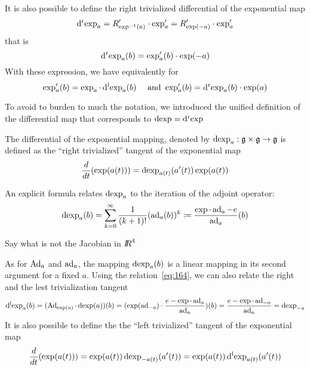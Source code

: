 It is also possible to define the right trivialized differential of the exponential map
\begin{equation}
  \label{eq:162}
  \operatorname{d^r exp}_a = R'_{\exp^{-1}(a)} \cdot \exp_a' = R'_{\exp(-a)} \cdot \exp_a' 
\end{equation}
that is
\begin{equation}
  \label{eq:163}
  \operatorname{d^r exp}_a(b) = \exp'_a(b) \cdot \exp(-a)
\end{equation}
With these expression, we have equivalently for 
\begin{equation}
  \label{eq:157}
   \exp_a'(b)  = \exp_a \cdot \operatorname{d^l exp}_a(b)\quad \text{ and } \exp_a'(b)  = \operatorname{d^r exp}_a(b) \cdot   \exp(a)
\end{equation}


To avoid to burden to much the notation, we introduced the unified definition of the differential map  that corresponds to $\operatorname{dexp}=\operatorname{d^r exp}$ 
\begin{definition}
The differential of the exponential mapping, denoted by $\operatorname{dexp}_a : \mathfrak g \times \mathfrak g \rightarrow \mathfrak g$ is defined as the ``right trivialized'' tangent of the exponential map
\begin{equation}
  \label{eq:42}
  \frac{d}{dt} (\exp(a(t))) = \operatorname{dexp}_{a(t)}(a'(t)) \exp(a(t))
\end{equation}
\end{definition}
An explicit formula relates $\operatorname{dexp}_{a}$ to the iteration of the adjoint operator:
\begin{equation}
  \label{eq:43}
  \operatorname{dexp}_a(b) = \sum_{k=0}^\infty \frac{1}{(k+1)!} (\operatorname{ad}_a(b))^k \coloneqq \frac{\exp\cdot\operatorname{ad}_a-e}{\operatorname{ad}_a}(b)
\end{equation}


\begin{ndrva}
  Say what is not the Jacobian in $\mbox{\rm $I\!\!R$}^4$
\end{ndrva}

As for $\operatorname{Ad}_a$ and $\operatorname{ad}_a$, the mapping $\operatorname{dexp}_{a}(b)$ is a linear mapping in its second argument for a fixed $a$. Using the relation~\eqref{eq:164}, we can also relate the right and the lest trivialization tangent
\begin{equation}
  \label{eq:165}
\operatorname{d^l exp}_a (b) =   (\operatorname{Ad}_{\exp(a)} \cdot \operatorname{dexp}(a))(b) = (\exp(\operatorname{ad}_{-a}) \cdot \frac{e - \exp\cdot\operatorname{ad}_a}{\operatorname{ad}_a})(b) = \frac{e - \exp\cdot\operatorname{ad}_{-a}}{\operatorname{ad}_a} = \operatorname{dexp}_{-a}
\end{equation}
It is also possible to define the  the ``left trivialized'' tangent of the exponential map
\begin{equation}
  \label{eq:46}
   \frac{d}{dt} (\exp(a(t))) =  \exp(a(t)) \operatorname{dexp}_{-a(t)}(a'(t)) =  \exp(a(t)) \operatorname{d^l exp}_{a(t)}(a'(t))
\end{equation}

